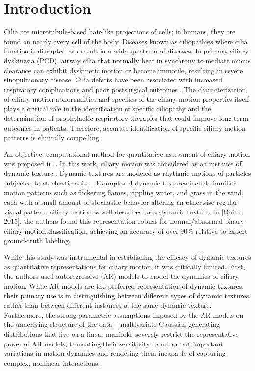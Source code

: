 \section{Introduction}

Cilia are microtubule-based hair-like projections of cells; in humans, they are found on nearly every cell of the body. Diseases known as ciliopathies where cilia function is disrupted can result in a wide spectrum of diseases. In primary ciliary dyskinesia (PCD), airway cilia that normally beat in synchrony to mediate mucus clearance can exhibit dyskinetic motion or become immotile, resulting in severe sinopulmonary disease\cite{o2007diagnosing}. Cilia defects have been associated with increased respiratory complications and poor postsurgical outcomes \cite{nakhleh2012high}. The characterization of ciliary motion abnormalities and specifics of the ciliary motion properties itself plays a critical role in the identification of specific ciliopathy and the determination of prophylactic respiratory therapies that could improve long-term outcomes in patients. Therefore, accurate identification of specific ciliary motion patterns is clinically compelling.

An objective, computational method for quantitative assessment of ciliary motion was proposed in~\cite{quinn2015automated}. In this work, ciliary motion was considered as an instance of dynamic texture \cite{saisan2001dynamic}. Dynamic textures are modeled as rhythmic motions of particles subjected to stochastic noise \cite{chen2013automatic}. Examples of dynamic textures include familiar motion patterns such as flickering flames, rippling water, and grass in the wind, each with a small amount of stochastic behavior altering an otherwise regular visual pattern. ciliary motion is well described as a dynamic texture. In [Quinn 2015], the authors found this representation robust for normal/abnormal binary ciliary motion classification, achieving an accuracy of over 90\% relative to expert ground-truth labeling.

While this study was instrumental in establishing the efficacy of dynamic textures as quantitative representations for ciliary motion, it was critically limited. First, the authors used autoregressive (AR) models \cite{hyndman2007higher} to model the dynamics of ciliary motion. While AR models are the preferred representation of dynamic textures, their primary use is in distinguishing between different types of dynamic textures, rather than between different instances of the same dynamic texture. Furthermore, the strong parametric assumptions imposed by the AR models on the underlying structure of the data -- multivariate Gaussian generating distributions that live on a linear manifold--severely restrict the representative power of AR models, truncating their sensitivity to minor but important variations in motion dynamics and rendering them incapable of capturing complex, nonlinear interactions.

